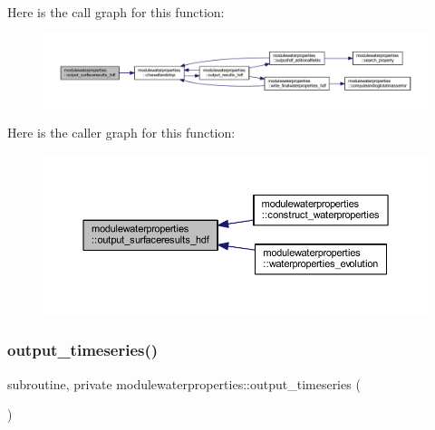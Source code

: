 Here is the call graph for this function\+:\nopagebreak
\begin{figure}[H]
\begin{center}
\leavevmode
\includegraphics[width=350pt]{namespacemodulewaterproperties_a3c8948249582551960c897355058c5f0_cgraph}
\end{center}
\end{figure}
Here is the caller graph for this function\+:\nopagebreak
\begin{figure}[H]
\begin{center}
\leavevmode
\includegraphics[width=350pt]{namespacemodulewaterproperties_a3c8948249582551960c897355058c5f0_icgraph}
\end{center}
\end{figure}
\mbox{\label{namespacemodulewaterproperties_a0725e3aa303d243b60469b2ad581deaa}} 
\subsubsection{\texorpdfstring{output\+\_\+timeseries()}{output\_timeseries()}}
{\footnotesize\ttfamily subroutine, private modulewaterproperties\+::output\+\_\+timeseries (\begin{DoxyParamCaption}{ }\end{DoxyParamCaption})\hspace{0.3cm}{\ttfamily [private]}}

